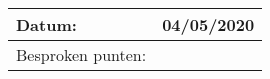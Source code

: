 \begin{tabularx}{\textwidth}{| l | X |}
  \hline
  Datum: & 04/05/2020\\
  \hline
  Besproken punten: &
  \begin{compactitem}
    \item \hl{}
    \item \hl{}
    \item \hl{}
  \end{compactitem}\\
  \hline
\end{tabularx}